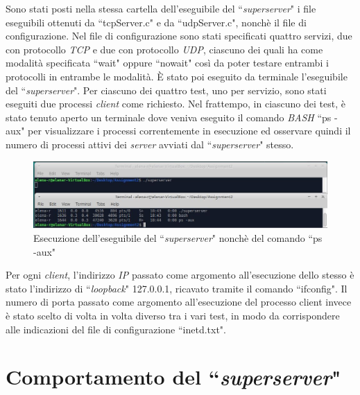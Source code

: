 \documentclass[a4paper, 12pt]{report}
\begin{document}
Sono stati posti nella stessa cartella dell'eseguibile del ``\textit{superserver}" i file eseguibili ottenuti da ``tcpServer.c" e da ``udpServer.c", nonchè il file di
configurazione. Nel file di configurazione sono stati specificati quattro servizi, due con protocollo \textit{TCP} e due con protocollo \textit{UDP}, ciascuno dei quali
ha come modalità specificata ``wait" oppure ``nowait" così da poter testare entrambi i protocolli in entrambe le modalità. È stato poi eseguito da terminale l'eseguibile
del ``\textit{superserver}". Per ciascuno dei quattro test, uno per servizio, sono stati eseguiti due processi \textit{client} come richiesto. Nel frattempo, in ciascuno
dei test, è stato tenuto aperto un terminale dove veniva eseguito il comando \textit{BASH} ``ps -aux" per visualizzare i processi correntemente in esecuzione ed osservare
quindi il numero di processi attivi dei \textit{server} avviati dal ``\textit{superserver}" stesso.

\begin{figure}[H]
	\centering
	\includegraphics[width=\linewidth]{images/launch_superserver.JPG}
	\caption{Esecuzione dell'eseguibile del ``\textit{superserver}" nonchè del comando ``ps -aux"}
\end{figure}

Per ogni \textit{client}, l'indirizzo \textit{IP} passato come argomento all'esecuzione dello stesso è 
stato l'indirizzo di ``\textit{loopback}" 127.0.0.1, ricavato tramite il comando ``ifconfig". Il numero di porta passato come argomento all'esecuzione del processo client
invece è stato scelto di volta in volta diverso tra i vari test, in modo da corrispondere alle indicazioni del file di configurazione ``inetd.txt".

\section{Comportamento del ``\textit{superserver}"}
\end{document}

